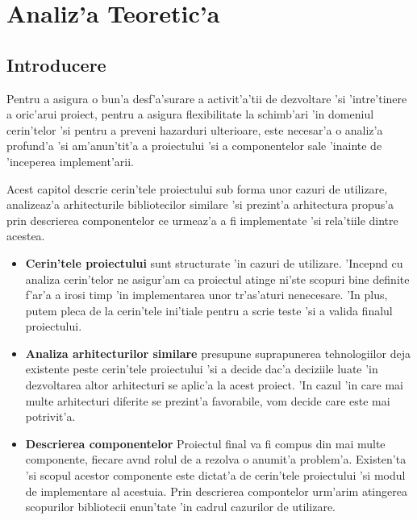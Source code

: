 \chapter{Analiz'a Teoretic'a}

\section{Introducere}

Pentru a asigura o bun'a desf'a'surare a activit'a'tii de dezvoltare 'si 'intre'tinere a oric'arui proiect, pentru a asigura flexibilitate la schimb'ari 'in domeniul cerin'telor 'si pentru a preveni hazarduri ulterioare, este necesar'a o analiz'a profund'a 'si am'anun'tit'a a proiectului 'si a componentelor sale 'inainte de 'inceperea implement'arii.

\medskip

Acest capitol descrie cerin'tele proiectului sub forma unor cazuri de utilizare, analizeaz'a arhitecturile bibliotecilor similare 'si prezint'a arhitectura propus'a prin descrierea componentelor ce urmeaz'a a fi implementate 'si rela'tiile dintre acestea.

\begin{itemize}
\item {\bf Cerin'tele proiectului} sunt structurate 'in cazuri de utilizare. 'Incep{\ia}nd cu analiza cerin'telor ne asigur'am ca proiectul atinge ni'ste scopuri bine definite f'ar'a a irosi timp 'in implementarea unor tr'as'aturi nenecesare. 'In plus, putem pleca de la cerin'tele ini'tiale pentru a scrie teste 'si a valida finalul proiectului.

\item {\bf Analiza arhitecturilor similare} presupune suprapunerea tehnologiilor deja existente peste cerin'tele proiectului 'si a decide dac'a deciziile luate 'in dezvoltarea altor arhitecturi se aplic'a la acest proiect. 'In cazul 'in care mai multe arhitecturi diferite se prezint'a favorabile, vom decide care este mai potrivit'a.

\item {\bf Descrierea componentelor} Proiectul final va fi compus din mai multe componente, fiecare av{\ia}nd rolul de a rezolva o anumit'a problem'a. Existen'ta 'si scopul acestor componente este dictat'a de cerin'tele proiectului 'si modul de implementare al acestuia. Prin descrierea compontelor urm'arim atingerea scopurilor bibliotecii enun'tate 'in cadrul cazurilor de utilizare.

\end{itemize}

